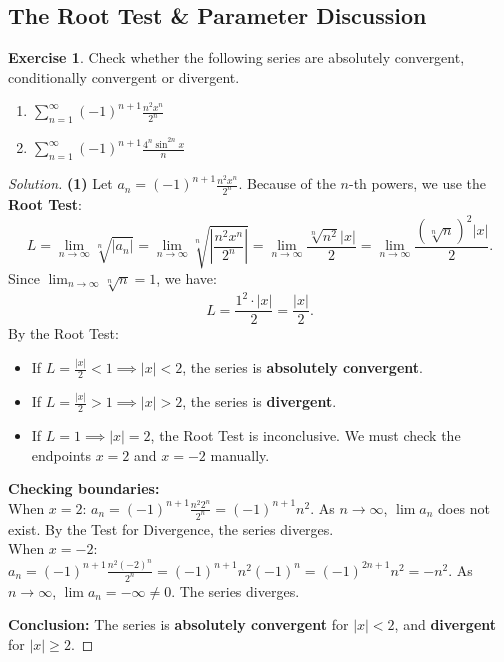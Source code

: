 \documentclass[11pt]{article}
\theoremstyle{definition}
\newtheorem{exercise}{Exercise}[section]
\newenvironment{solution}{\begin{proof}[Solution]}{\end{proof}}
\begin{document}
\subsection{The Root Test \& Parameter Discussion}

\begin{exercise}
Check whether the following series are absolutely convergent, conditionally convergent or divergent.
\begin{enumerate}
    \item $\displaystyle \sum_{n=1}^{\infty} (-1)^{n+1}\frac{n^2 x^n}{2^n}$
    \item $\displaystyle \sum_{n=1}^{\infty} (-1)^{n+1}\frac{4^n \sin^{2n}x}{n}$
\end{enumerate}
\end{exercise}

\begin{solution}
\textbf{(1)} Let $a_n = (-1)^{n+1}\frac{n^2 x^n}{2^n}$. Because of the $n$-th powers, we use the \textbf{Root Test}:
\[
L = \lim_{n \to \infty} \sqrt[n]{|a_n|} = \lim_{n \to \infty} \sqrt[n]{\left| \frac{n^2 x^n}{2^n} \right|} = \lim_{n \to \infty} \frac{\sqrt[n]{n^2} |x|}{2} = \lim_{n \to \infty} \frac{(\sqrt[n]{n})^2 |x|}{2}.
\]
Since $\lim_{n \to \infty} \sqrt[n]{n} = 1$, we have:
\[
L = \frac{1^2 \cdot |x|}{2} = \frac{|x|}{2}.
\]
By the Root Test:
\begin{itemize}
    \item If $L = \frac{|x|}{2} < 1 \implies |x| < 2$, the series is \textbf{absolutely convergent}.
    \item If $L = \frac{|x|}{2} > 1 \implies |x| > 2$, the series is \textbf{divergent}.
    \item If $L = 1 \implies |x| = 2$, the Root Test is inconclusive. We must check the endpoints $x = 2$ and $x = -2$ manually.
\end{itemize}
\textbf{Checking boundaries:} \\
When $x = 2$: $a_n = (-1)^{n+1}\frac{n^2 2^n}{2^n} = (-1)^{n+1}n^2$. As $n \to \infty$, $\lim a_n$ does not exist. By the Test for Divergence, the series diverges. \\
When $x = -2$: $a_n = (-1)^{n+1}\frac{n^2 (-2)^n}{2^n} = (-1)^{n+1} n^2 (-1)^n = (-1)^{2n+1} n^2 = -n^2$. As $n \to \infty$, $\lim a_n = -\infty \neq 0$. The series diverges.

\textbf{Conclusion:} The series is \textbf{absolutely convergent} for $|x| < 2$, and \textbf{divergent} for $|x| \ge 2$.


\end{solution}
\end{document}
